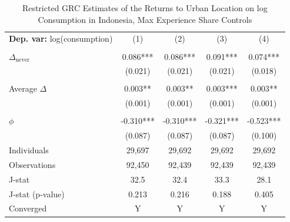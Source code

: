 \begin{table}[htbp] \centering \begin{threeparttable}
 \caption{Restricted GRC Estimates of the Returns to Urban Location on log Consumption in Indonesia, Max Experience Share Controls} 
 \label{tab:GRC_IDN_consumption_urban_unb_exp_m_sh} 
\begin{tabular}{l cccc} \toprule  \textbf{Dep. var:}  log(consumption) 
                    &\multicolumn{1}{c}{(1)}   &\multicolumn{1}{c}{(2)}   &\multicolumn{1}{c}{(3)}   &\multicolumn{1}{c}{(4)}   \\
                    &               &               &               &               \\
\addlinespace
$\Delta_{\text{never}}$&       0.086***&       0.086***&       0.091***&       0.074***\\
                    &     (0.021)   &     (0.021)   &     (0.021)   &     (0.018)   \\
                    &               &               &               &               \\
\addlinespace
Average $\Delta$    &       0.003** &       0.003** &       0.003***&       0.003** \\
                    &     (0.001)   &     (0.001)   &     (0.001)   &     (0.001)   \\
                    &               &               &               &               \\
\addlinespace
$\phi$              &      -0.310***&      -0.310***&      -0.321***&      -0.523***\\
                    &     (0.087)   &     (0.087)   &     (0.087)   &     (0.100)   \\
\addlinespace
Individuals         &      29,697   &      29,692   &      29,692   &      29,692   \\
Observations        &      92,450   &      92,439   &      92,439   &      92,439   \\
J-stat              &        32.5   &        32.4   &        33.3   &        28.1   \\
J-stat (p-value)    &       0.213   &       0.216   &       0.188   &       0.405   \\
Converged           &           Y   &           Y   &           Y   &           Y   \\

\end{tabular}
\end{threeparttable}
\end{table}
